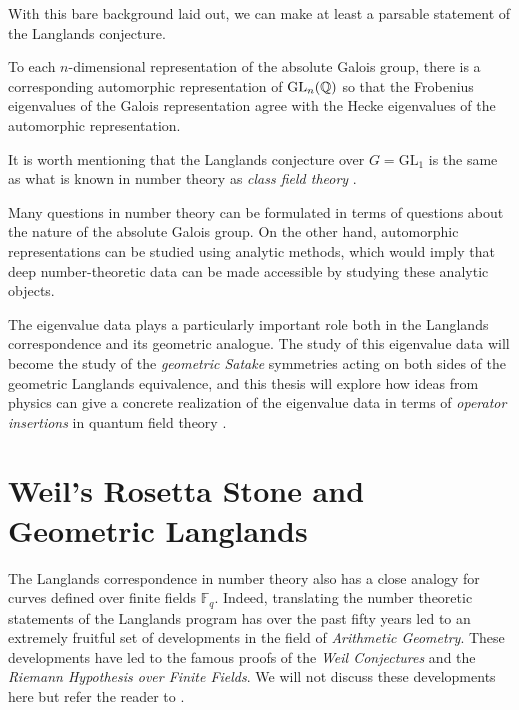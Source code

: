 With this bare background laid out, we can make at least a parsable statement of the Langlands conjecture.

\begin{conj}[Langlands]
	To each $n$-dimensional representation of the absolute Galois group, there is a corresponding automorphic representation of $\mathrm{GL}_n(\mathbb{Q})$ so that the Frobenius eigenvalues of the Galois representation agree with the Hecke eigenvalues of the automorphic representation.
\end{conj}

It is worth mentioning that the Langlands conjecture over $G = \mathrm{GL}_1$ is the same as what is known in number theory as \emph{class field theory} \cite{Yoo18}. 


Many questions in number theory can be formulated in terms of questions about the nature of the absolute Galois group. On the other hand, automorphic representations can be studied using analytic methods, which would imply that deep number-theoretic data can be made accessible by studying these analytic objects.

The eigenvalue data plays a particularly important role both in the Langlands correspondence and its geometric analogue. The study of this eigenvalue data will become the study of the \emph{geometric Satake} symmetries acting on both sides of the geometric Langlands equivalence, and this thesis will explore how ideas from physics can give a concrete realization of the eigenvalue data in terms of \emph{operator insertions} in quantum field theory \cite{kapustin2006}. 


\section{Weil's Rosetta Stone and Geometric Langlands} %
\label{sec:weil_s_rosetta_stone_and_geometric_langlands}

The Langlands correspondence in number theory also has a close analogy for curves defined over finite fields $\mathbb F_q$. Indeed, translating the number theoretic statements of the Langlands program has over the past fifty years led to an extremely fruitful set of developments in the field of \emph{Arithmetic Geometry}. These developments have led to the famous proofs of the \emph{Weil Conjectures} and the \emph{Riemann Hypothesis over Finite Fields}. We will not discuss these developments here but refer the reader to \cite{osserman2008}. 

